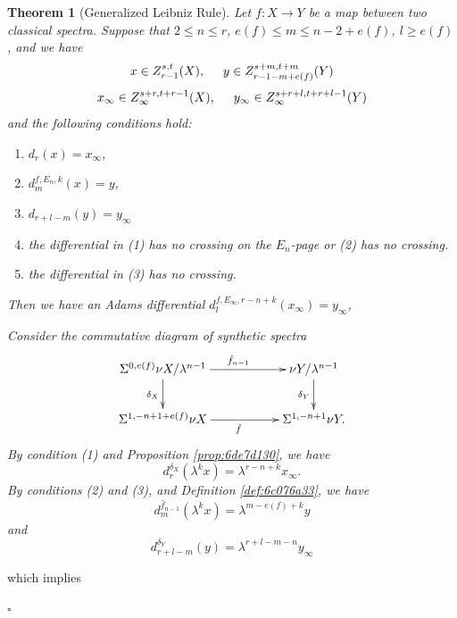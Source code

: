 \documentclass[12pt,a4paper]{article}
\renewenvironment{proof}{{\noindent\it\textbf{Proof}}\quad\it}{\hfill$\square$}
\newtheorem{theorem}[equation]{Theorem}
\newcommand{\Sus}{\Sigma}
\begin{document}
\begin{sloppy}
\begin{theorem}[Generalized Leibniz Rule]\label{thm:e73f481eB}
    Let $f: X\to Y$ be a map between two classical spectra.
    Suppose that $2\le n\le r$, $e(f)\le m\le n-2+e(f)$, $l\ge e(f)$, and we have
    $$x\in Z_{r-1}^{s,t}(X), \hspace{0.5cm} y\in Z_{r-1-m+e(f)}^{s+m,t+m}(Y)$$
    $$x_\infty\in Z_\infty^{s+r,t+r-1}(X), \hspace{0.5cm} y_\infty\in Z_\infty^{s+r+l,t+r+l-1}(Y)$$
    and the following conditions hold:
    \begin{enumerate}
        \item $d_{r}(x)=x_\infty$,
        \item $d_{m}^{f,E_n, k}(x)=y$,
        \item     $d_{r+l-m}(y)= y_\infty$
        \item the differential in (1) has no crossing on the $E_n$-page or (2) has no crossing.
        \item the differential in (3) has no crossing.%
    \end{enumerate}
    Then we have an Adams differential
    $d_{l}^{f,E_\infty, r-n+k}(x_\infty)=y_\infty$,

\end{theorem}

\begin{proof}
    Consider the commutative diagram of synthetic spectra
    $$\xymatrix{
        \Sus^{0,e(f)}\nu X/\lambda^{n-1} \ar[rr]^{\hat f_{n-1}}\ar[d]_{\delta_X} && \nu Y/\lambda^{n-1}\ar[d]_{\delta_Y}\\
        \Sus^{1,-n+1+e(f)} \nu X \ar[rr]_{\hat f} && \Sus^{1,-n+1}\nu Y.
    }$$
    By condition (1) and Proposition \ref{prop:6de7d130}, we have
    \begin{equation}\label{eq:ca3fdd92B}
        d^{\delta_X}_r(\lambda^kx)=\lambda^{r-n+k}x_\infty.
    \end{equation}
    By conditions (2) and (3), and Definition \ref{def:6c076a33}, we have
    \begin{equation}\label{eq:b2aa5032B}
        d^{\hat f_{n-1}}_m(\lambda^k x)=\lambda^{m-e(f)+k} y
    \end{equation}
    and
$$d_{r+l-m}^{\delta_Y}(y)= \lambda^{r+l-m-n}y_\infty$$

    which implies


\end{proof}
\end{sloppy}
\end{document}
